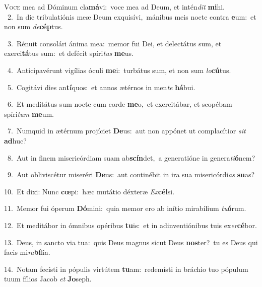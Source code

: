 \lettrine{\initial\textcolor{\initialcolor}{V}}{oce} mea ad Dóminum cla\-\textbf{má}\-vi:~\star voce mea ad Deum, et intén\textit{dit} \textbf{mi}\-hi.\\
{\numbfont\textcolor{\numbcolor}{~2.}}~In die tribulatiónis meæ Deum exquisívi,~\dagger mánibus meis nocte contra \textbf{e}\-um:~\star et non sum \textit{de}\-\textbf{cép}tus.\par
{\numbfont\textcolor{\numbcolor}{~3.}}~Rénuit consolári ánima mea:~\dagger memor fui Dei, et delectátus sum, et exerci\-\textbf{tá}\-tus sum:~\star et defécit spíri\textit{tus} \textbf{me}\-us.\par
{\numbfont\textcolor{\numbcolor}{~4.}}~Anticipavérunt vigílias óculi \textbf{me}\-i:~\star turbátus sum, et non sum \textit{lo}\-\textbf{cú}tus.\par
{\numbfont\textcolor{\numbcolor}{~5.}}~Cogitávi dies an\-\textbf{tí}\-quos:~\star et annos ætérnos in men\textit{te} \textbf{há}\-bui.\par
{\numbfont\textcolor{\numbcolor}{~6.}}~Et meditátus sum nocte cum corde \textbf{me}\-o,~\star et exercitábar, et scopébam spíri\textit{tum} \textbf{me}\-um.\par
{\numbfont\textcolor{\numbcolor}{~7.}}~Numquid in ætérnum projíciet \textbf{De}\-us:~\star aut non appónet ut complacítior \textit{sit} \textbf{ad}\-huc?\par
{\numbfont\textcolor{\numbcolor}{~8.}}~Aut in finem misericórdiam suam ab\-\textbf{scín}\-det,~\star a generatióne in genera\-\textit{ti}\-\textbf{ó}nem?\par
{\numbfont\textcolor{\numbcolor}{~9.}}~Aut obliviscétur miseréri \textbf{De}\-us:~\star aut continébit in ira sua misericórdi\textit{as} \textbf{su}\-as?\par
{\numbfont\textcolor{\numbcolor}{10.}}~Et dixi: Nunc \textbf{cœ}\-pi:~\star hæc mutátio déxteræ \textit{Ex}\-\textbf{cél}si.\par
{\numbfont\textcolor{\numbcolor}{11.}}~Memor fui óperum \textbf{Dó}\-mini:~\star quia memor ero ab inítio mirabílium \textit{tu}\-\textbf{ó}rum.\par
{\numbfont\textcolor{\numbcolor}{12.}}~Et meditábor in ómnibus opéribus \textbf{tu}\-is:~\star et in adinventiónibus tuis ex\-\textit{er}\-\textbf{cé}bor.\par
{\numbfont\textcolor{\numbcolor}{13.}}~Deus, in sancto via tua:~\dagger quis Deus magnus sicut Deus \textbf{nos}\-ter?~\star tu es Deus qui facis mi\-\textit{ra}\-\textbf{bí}lia.\par
{\numbfont\textcolor{\numbcolor}{14.}}~Notam fecísti in pópulis virtútem \textbf{tu}\-am:~\star redemísti in bráchio tuo pópulum tuum fílios Jacob \textit{et} \textbf{Jo}\-seph.\par
